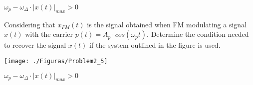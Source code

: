 \documentclass[idioma,boletin]{uah}
\begin{document}
{
$\omega_p - \omega_\Delta \cdot |x(t)|_{max} > 0$

}
{

	Considering that $x_{FM}(t)$ is the signal obtained when FM modulating a signal $x(t)$ with the carrier $p(t)=A_p \cdot cos(\omega_p t)$. Determine the condition needed to recover the signal $x(t)$ if the system outlined in the figure is used.
	
	{\begin{figure*}[h!]\centering\texttt{[image: ./Figuras/Problem2\_5]}\end{figure*}}
}
{
$\omega_p - \omega_\Delta \cdot |x(t)|_{max} > 0$

}
\end{document}
